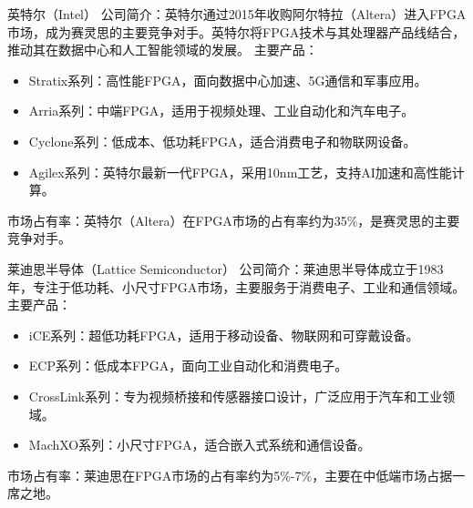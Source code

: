 \documentclass{beamer}
\providecommand{\tightlist}{%
  \setlength{\itemsep}{0pt}\setlength{\parskip}{0pt}}
\begin{document}
\begin{frame}{英特尔（Intel）}
公司简介：英特尔通过2015年收购阿尔特拉（Altera）进入FPGA市场，成为赛灵思的主要竞争对手。英特尔将FPGA技术与其处理器产品线结合，推动其在数据中心和人工智能领域的发展。
主要产品：

\begin{itemize}
\tightlist
\item
    Stratix系列：高性能FPGA，面向数据中心加速、5G通信和军事应用。
\item
    Arria系列：中端FPGA，适用于视频处理、工业自动化和汽车电子。
\item
    Cyclone系列：低成本、低功耗FPGA，适合消费电子和物联网设备。
\item
    Agilex系列：英特尔最新一代FPGA，采用10nm工艺，支持AI加速和高性能计算。
\end{itemize}

市场占有率：英特尔（Altera）在FPGA市场的占有率约为35\%，是赛灵思的主要竞争对手。
\end{frame}

\begin{frame}{莱迪思半导体（Lattice Semiconductor）}
公司简介：莱迪思半导体成立于1983年，专注于低功耗、小尺寸FPGA市场，主要服务于消费电子、工业和通信领域。
主要产品：

\begin{itemize}
\tightlist
\item
    iCE系列：超低功耗FPGA，适用于移动设备、物联网和可穿戴设备。
\item
    ECP系列：低成本FPGA，面向工业自动化和消费电子。
\item
    CrossLink系列：专为视频桥接和传感器接口设计，广泛应用于汽车和工业领域。
\item
    MachXO系列：小尺寸FPGA，适合嵌入式系统和通信设备。
\end{itemize}

市场占有率：莱迪思在FPGA市场的占有率约为5\%-7\%，主要在中低端市场占据一席之地。
\end{frame}
\end{document}
